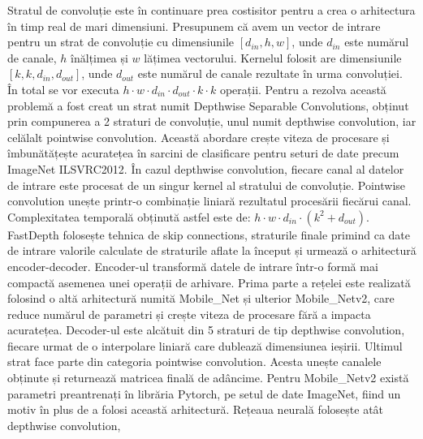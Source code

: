 \documentclass[12pt,a4paper]{report}
\begin{document}
Stratul de convoluție este în continuare prea costisitor pentru a crea o arhitectura în timp
real de mari dimensiuni. Presupunem că avem un vector de intrare pentru un strat de convoluție
cu dimensiunile \([d_{in}, h, w]\), unde \(d_{in}\) este numărul de canale,  \(h \) înălțimea și \(w\) lățimea vectorului.
Kernelul folosit are dimensiunile \([k, k, d_{in}, d_{out}]\),
unde \(d_{out}\) este numărul de canale rezultate în urma convoluției.
În total se vor executa $ h \cdot w \cdot d_{in} \cdot d_{out} \cdot k \cdot k$ operații.
Pentru  a rezolva această problemă a fost creat un strat numit Depthwise Separable Convolutions\cite{sifre2014rigidmotionscatteringtextureclassification}, 
obținut prin compunerea a 2 straturi de convoluție, unul numit depthwise convolution,
iar celălalt pointwise convolution. Această abordare crește viteza de procesare și îmbunătățește
acuratețea în sarcini de clasificare pentru seturi de date precum ImageNet ILSVRC2012. În cazul 
depthwise convolution, fiecare canal al datelor de intrare este procesat de un singur kernel
al stratului de convoluție. Pointwise convolution unește printr-o combinație liniară
rezultatul procesării fiecărui canal. Complexitatea temporală obținută astfel este de:
$ h \cdot w \cdot d_{in} \cdot (k^2 + d_{out})$\cite{fast}. \\ 

FastDepth folosește tehnica de skip connections, straturile finale primind ca date de intrare
valorile calculate de straturile aflate la început și urmează o arhitectură encoder-decoder. 
Encoder-ul transformă datele de intrare într-o formă mai compactă asemenea unei operații de arhivare.
Prima parte a rețelei este realizată folosind o altă arhitectură numită Mobile\_Net\cite{howard2017mobilenetsefficientconvolutionalneural} și 
ulterior Mobile\_Netv2\cite{sandler2019mobilenetv2invertedresidualslinear}, 
care reduce numărul de parametri și crește viteza de procesare fără a impacta acuratețea. 
Decoder-ul este alcătuit din 5 straturi de tip depthwise convolution, fiecare urmat de o 
interpolare liniară care dublează dimensiunea ieșirii. Ultimul strat face parte din categoria 
pointwise convolution. Acesta unește canalele obținute și returnează matricea finală de adâncime. Pentru
Mobile\_Netv2 există parametri preantrenați în librăria Pytorch\cite{paszke2017automatic}, pe setul de date ImageNet,
fiind un motiv în plus de a folosi această arhitectură. Rețeaua neurală folosește atât depthwise convolution,
\end{document}
